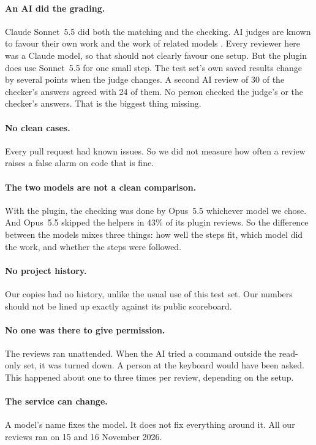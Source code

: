 \documentclass[11pt]{article}
\begin{document}
\paragraph{An AI did the grading.} Claude Sonnet~5.5 did both the matching and the checking. AI judges are known to favour their own work and the work of related models \citep{zheng2023judging,panickssery2024self,spiliopoulou2025favorites}. Every reviewer here was a Claude model, so that should not clearly favour one setup. But the plugin does use Sonnet~5.5 for one small step. The test set's own saved results change by several points when the judge changes. A second AI review of 30 of the checker's answers agreed with 24 of them. No person checked the judge's or the checker's answers. That is the biggest thing missing.

\paragraph{No clean cases.} Every pull request had known issues. So we did not measure how often a review raises a false alarm on code that is fine.

\paragraph{The two models are not a clean comparison.} With the plugin, the checking was done by Opus~5.5 whichever model we chose. And Opus~5.5 skipped the helpers in 43\% of its plugin reviews. So the difference between the models mixes three things: how well the steps fit, which model did the work, and whether the steps were followed.

\paragraph{No project history.} Our copies had no history, unlike the usual use of this test set. Our numbers should not be lined up exactly against its public scoreboard.

\paragraph{No one was there to give permission.} The reviews ran unattended. When the AI tried a command outside the read-only set, it was turned down. A person at the keyboard would have been asked. This happened about one to three times per review, depending on the setup.

\paragraph{The service can change.} A model's name fixes the model. It does not fix everything around it. All our reviews ran on 15 and 16 November 2026.
\end{document}
